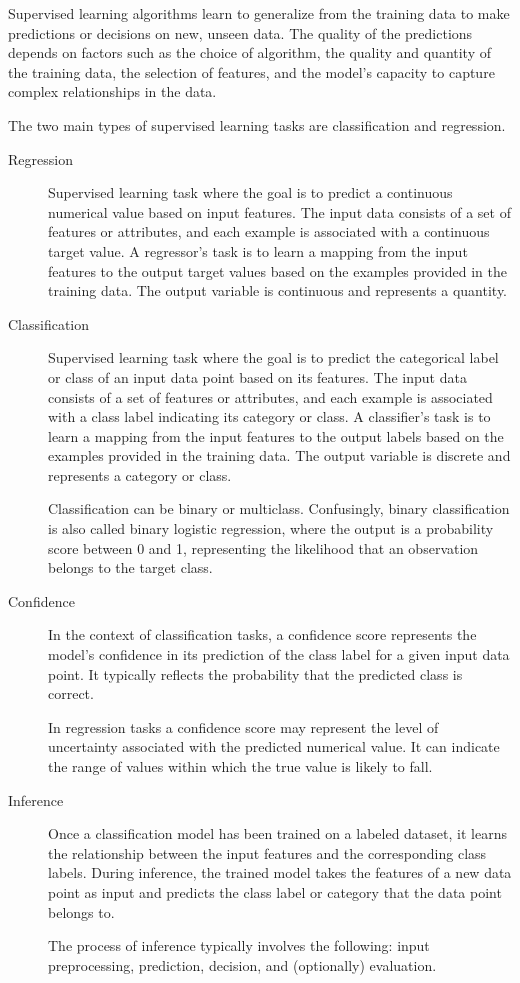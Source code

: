 \documentclass[a4paper]{article}
\begin{document}
Supervised learning algorithms learn to generalize from the training data to make predictions or decisions on new, unseen data. The quality of the predictions depends on factors such as the choice of algorithm, the quality and quantity of the training data, the selection of features, and the model's capacity to capture complex relationships in the data.

The two main types of supervised learning tasks are classification and regression.

\begin{description}
\item[Regression]
Supervised learning task where the goal is to predict a continuous numerical value based on input features. The input data consists of a set of features or attributes, and each example is associated with a continuous target value. A regressor's task is to learn a mapping from the input features to the output target values based on the examples provided in the training data. The output variable is continuous and represents a quantity.
    
\item[Classification]
Supervised learning task where the goal is to predict the categorical label or class of an input data point based on its features. The input data consists of a set of features or attributes, and each example is associated with a class label indicating its category or class. A classifier's task is to learn a mapping from the input features to the output labels based on the examples provided in the training data. The output variable is discrete and represents a category or class.

Classification can be binary or multiclass. Confusingly, binary classification is also called binary logistic regression, where the output is a probability score between 0 and 1, representing the likelihood that an observation belongs to the target class.

\item[Confidence]
In the context of classification tasks, a confidence score represents the model's confidence in its prediction of the class label for a given input data point. It typically reflects the probability that the predicted class is correct. 

In regression tasks a confidence score may represent the level of uncertainty associated with the predicted numerical value. It can indicate the range of values within which the true value is likely to fall.

\item[Inference]
Once a classification model has been trained on a labeled dataset, it learns the relationship between the input features and the corresponding class labels. During inference, the trained model takes the features of a new data point as input and predicts the class label or category that the data point belongs to.

The process of inference typically involves the following: input preprocessing, prediction, decision, and (optionally) evaluation.
\end{description}
\end{document}

